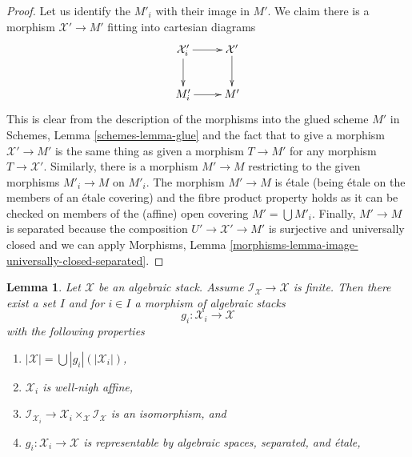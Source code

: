 \documentclass{stacks-project}
\theoremstyle{plain}
\newtheorem{lemma}[subsection]{Lemma}
\theoremstyle{definition}
\theoremstyle{remark}
\numberwithin{equation}{subsection}
\begin{document}
\begin{proof}
Let us identify the $M'_i$ with their image in $M'$.
We claim there is a morphism $\mathcal{X}' \to M'$ fitting into
cartesian diagrams
$$
\xymatrix{
\mathcal{X}'_i \ar[r] \ar[d] & \mathcal{X}' \ar[d] \\
M'_i \ar[r] & M'
}
$$
This is clear from the description of the morphisms into the glued scheme $M'$
in Schemes, Lemma \ref{schemes-lemma-glue} and the fact that to give a morphism
$\mathcal{X}' \to M'$ is the same thing as given a morphism $T \to M'$
for any morphism $T \to \mathcal{X}'$.
Similarly, there is a morphism $M' \to M$ restricting to the
given morphisms $M'_i \to M$ on $M'_i$.
The morphism $M' \to M$ is \'etale (being \'etale on the members of an
\'etale covering) and the fibre product property holds as it can
be checked on members of the (affine) open covering $M' = \bigcup M'_i$.
Finally, $M' \to M$ is separated because the composition
$U' \to \mathcal{X}' \to M'$ is surjective and universally closed
and we can apply Morphisms, Lemma
\ref{morphisms-lemma-image-universally-closed-separated}.
\end{proof}

\begin{lemma}
\label{lemma-etale-local-finite-inertia}
Let $\mathcal{X}$ be an algebraic stack. Assume
$\mathcal{I}_\mathcal{X} \to \mathcal{X}$ is finite.
Then there exist a set $I$ and for $i \in I$ a morphism of algebraic stacks
$$
g_i : \mathcal{X}_i \longrightarrow \mathcal{X}
$$
with the following properties
\begin{enumerate}
\item $|\mathcal{X}| = \bigcup |g_i|(|\mathcal{X}_i|)$,
\item $\mathcal{X}_i$ is well-nigh affine,
\item $\mathcal{I}_{\mathcal{X}_i} \to
\mathcal{X}_i \times_\mathcal{X} \mathcal{I}_\mathcal{X}$
is an isomorphism, and
\item $g_i : \mathcal{X}_i \to \mathcal{X}$ is representable
by algebraic spaces, separated, and \'etale,
\end{enumerate}
\end{lemma}
\end{document}
